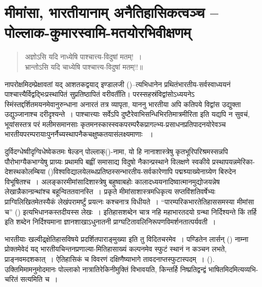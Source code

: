 
\chapter{मीमांसा, भारतीयानाम् अनैतिहासिकत्वञ्च – पोल्लाक-कुमारस्वामि-मतयोरभिवीक्षणम्}


\bgroup

\selectdev

\begin{verse}
अज्ञोऽसि यदि नाध्येषि पाश्चात्त्य-विदुषां मतम्!~।\\ भ्रान्तोऽसि यदि चाध्येषि पाश्चात्त्य-विदुषां मतम्!!॥
\end{verse}

\medskip

नापरोक्षमिदम्प्रेक्षावतां यद् आशतकद्वयाद् इण्डालजी ()–त्यभिधानेन प्रथितं\break भारतीय-सर्वस्वाध्ययनं पाश्चात्त्यैर्विद्वद्भिःप्रस्थापितं सुप्रतिष्ठापितं वरीवर्तीति। परस्सहस्रं\break विद्वांसोऽध्ययनेऽ स्मिंस्तद्दर्शितमयनमेवानुरुन्धाना अनारतं तत्र व्यापृता, याननु भारतीया अपि कतिपये विद्वांस उद्युक्ता उद्युञ्जानाश्च दरीदृश्यन्ते~। पाश्चात्त्याः सर्वेऽपि दुष्टैरेवाभिसन्धिभिरतिमात्रमीरिता इति यद्यपि न सुवचं, भूयांसस्तत्र परं मलीमसमानसाः कृतमनस्कास्स्वकपरम्परैक\-प्रागल्भ्य-प्रसाधनप्रतिपादनयोरेवञ्च भारतीयपरम्परायाःपुनर्नैच्यस्थापनैकचक्षुष्कतया\break संलक्ष्यमाणाः ~।

दुर्विदग्धेष्वीदृग्विधेष्वेकतमः षेल्डन् पोल्लाक्()-नामा, यो हि नानाशास्त्रेषु कृतभूरिपरिश्रमस्सन्नपि पौरोभाग्यैकभाग्येषु प्राग्र्यः प्रथामपि बह्वीं समासाद्य विदुषो नैकान्प्रस्थाने विलक्षणे स्वकीये प्रस्थापयन्नमेरिका-देशस्थकोलम्बिया ()विश्वविद्यालये\break लब्धप्रतिष्ठस्सन्भारतीय-सर्वकारेणापि पद्मश्र्याख्येनाग्र्येण बिरुदेन विभूषितश्च~। अलङ्कारमीमांसादिशास्त्रेषु बहुष्वाबहोः कालादध्ययनादिष्वात्मानमुद्योजयन्नेष लेखान्नैकान्ग्रन्थांश्च बहून्\break विततवानस्ति~। प्रकृते मीमांसाशास्त्रमधिकृत्य सप्तविंशतिवर्षेभ्यः प्राग्विलिखितमेतस्यैकं लेखं\break परामर्ष्टुं प्रयत्नः कश्चनात्र विधीयते~। “पारम्परिकभारतेतिहाससमस्या मीमांसा च” () इत्यभिधानकस्तदीयस्स लेखः~। इतिहासशब्देन चात्र नहि महाभारतदयो ग्रन्था निर्दिश्यन्ते किं तर्हि  इति शब्देन निर्दिश्यमाना ज्ञानशाखाऽधुनातनी प्राग्घटितावलिनिरूपणविमर्शनतात्पर्यवती~।

भारतीयाः खल्वीद्र्क्षेतिहासविषये प्रदर्शितपाराङ्मुख्या इति तु विदितचरमेव~। पण्डितेन लार्सन् () नाम्ना प्रोक्तमेवेदं यद् भारतीयचिन्तनप्रणाल्या-मितिहासाख्यं कल्पनमेव स्फुटं स्थानं न कञ्चन लभते, प्राङ्नवमदशकात्~। ऐतिहासिकं च विवरणं दक्षिणैष्याभागे तावदनाप्तस्फुटास्पदम्~। (). उक्तिमिमामनुमोदमानः पोल्लाको नात्रातिरेकिनीमुक्तिं विभावयति, किन्तर्हि निष्प्रतिद्वन्द्वं भाषितमिदमित्यव्यभि-चरितं सत्यमिति च~।


